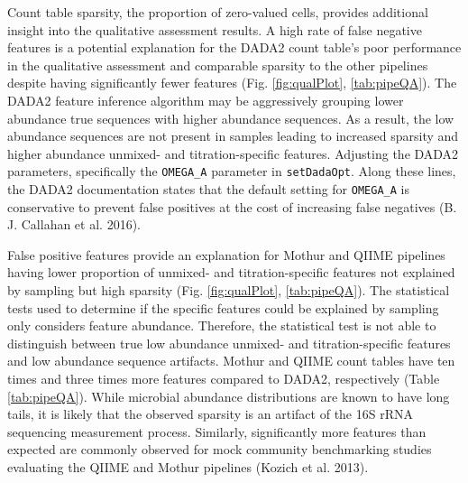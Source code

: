 \documentclass[smallextended]{svjour3}       %
\begin{document}
Count table sparsity, the proportion of zero-valued cells, provides
additional insight into the qualitative assessment results. A high rate
of false negative features is a potential explanation for the DADA2
count table's poor performance in the qualitative assessment and
comparable sparsity to the other pipelines despite having significantly
fewer features (Fig. \ref{fig:qualPlot}, \ref{tab:pipeQA}). The DADA2
feature inference algorithm may be aggressively grouping lower abundance
true sequences with higher abundance sequences. As a result, the low
abundance sequences are not present in samples leading to increased
sparsity and higher abundance unmixed- and titration-specific features.
Adjusting the DADA2 parameters, specifically the \texttt{OMEGA\_A}
parameter in \texttt{setDadaOpt}. Along these lines, the DADA2
documentation states that the default setting for \texttt{OMEGA\_A} is
conservative to prevent false positives at the cost of increasing false
negatives (B. J. Callahan et al. 2016).

False positive features provide an explanation for Mothur and QIIME
pipelines having lower proportion of unmixed- and titration-specific
features not explained by sampling but high sparsity (Fig.
\ref{fig:qualPlot}, \ref{tab:pipeQA}). The statistical tests used to
determine if the specific features could be explained by sampling only
considers feature abundance. Therefore, the statistical test is not able
to distinguish between true low abundance unmixed- and
titration-specific features and low abundance sequence artifacts. Mothur
and QIIME count tables have ten times and three times more features
compared to DADA2, respectively (Table \ref{tab:pipeQA}). While
microbial abundance distributions are known to have long tails, it is
likely that the observed sparsity is an artifact of the 16S rRNA
sequencing measurement process. Similarly, significantly more features
than expected are commonly observed for mock community benchmarking
studies evaluating the QIIME and Mothur pipelines (Kozich et al. 2013).
\end{document}
